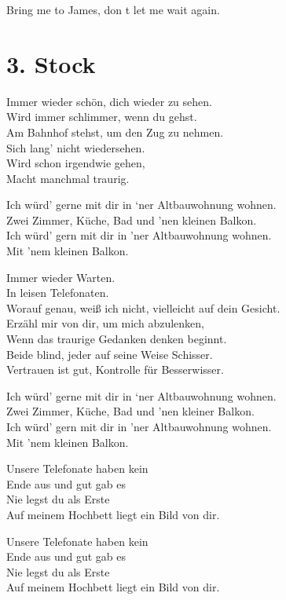\documentclass[]{book}
\begin{document}
Bring me to James, don t let me wait again.

\hypertarget{stock-1}{%
\section{3. Stock}\label{stock-1}}

Immer wieder schön, dich wieder zu sehen.\\
Wird immer schlimmer, wenn du gehst.\\
Am Bahnhof stehst, um den Zug zu nehmen.\\
Sich lang' nicht wiedersehen.\\
Wird schon irgendwie gehen,\\
Macht manchmal traurig.

Ich würd' gerne mit dir in `ner Altbauwohnung wohnen.\\
Zwei Zimmer, Küche, Bad und 'nen kleinen Balkon.\\
Ich würd' gern mit dir in 'ner Altbauwohnung wohnen.\\
Mit 'nem kleinen Balkon.

Immer wieder Warten.\\
In leisen Telefonaten.\\
Worauf genau, weiß ich nicht, vielleicht auf dein Gesicht.\\
Erzähl mir von dir, um mich abzulenken,\\
Wenn das traurige Gedanken denken beginnt.\\
Beide blind, jeder auf seine Weise Schisser.\\
Vertrauen ist gut, Kontrolle für Besserwisser.

Ich würd' gerne mit dir in `ner Altbauwohnung wohnen.\\
Zwei Zimmer, Küche, Bad und 'nen kleiner Balkon.\\
Ich würd' gern mit dir in 'ner Altbauwohnung wohnen.\\
Mit 'nem kleinen Balkon.

Unsere Telefonate haben kein\\
Ende aus und gut gab es\\
Nie legst du als Erste\\
Auf meinem Hochbett liegt ein Bild von dir.

Unsere Telefonate haben kein\\
Ende aus und gut gab es\\
Nie legst du als Erste\\
Auf meinem Hochbett liegt ein Bild von dir.
\end{document}
